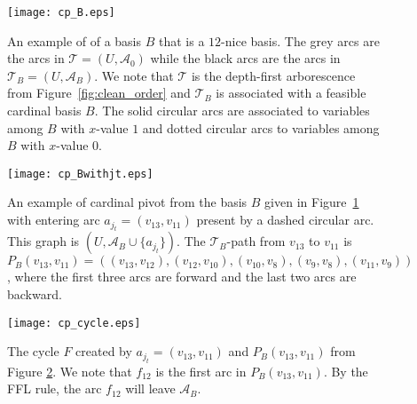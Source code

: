 \documentclass[11pt]{article}
\begin{document}
\begin{figure}[h!]
    \centering
    \texttt{[image: cp\_B.eps]}
    \caption{An example of of a basis $B$ that is a $12$-nice basis. The grey arcs are the arcs in  $\mathcal{T}=(U,\mathcal{A}_0)$ while the black arcs are the arcs in $\mathcal{T}_B=(U,\mathcal{A}_B)$. We note that $\mathcal{T}$ is the depth-first arborescence from Figure~\ref{fig:clean_order} and $\mathcal{T}_B$ is associated with a feasible cardinal basis $B$. The solid circular arcs are associated to variables among $B$ with $x$-value $1$ and dotted circular arcs to variables among $B$ with $x$-value $0$. }
    \label{fig:Pivoting-Ex-B}
\end{figure}

\begin{figure}[h!]
    \centering
    \texttt{[image: cp\_Bwithjt.eps]}
    \caption{An example of cardinal pivot from the basis $B$ given in Figure~\ref{fig:Pivoting-Ex-B} with entering arc $a_{j_t}=(v_{13},v_{11})$ present by a dashed circular arc. This graph is $(U,\mathcal{A}_B\cup\{a_{j_t}\})$. The $\mathcal{T}_B$-path from $v_{13}$ to $v_{11}$ is $P_B(v_{13},v_{11})=((v_{13},v_{12}),(v_{12},v_{10}),(v_{10},v_{8}),(v_{9},v_{8}),(v_{11},v_9))$, where the first three arcs are forward and the last two arcs are backward.}
    \label{fig:Pivoting-Ex-jt}
\end{figure}

\begin{figure}[h!]
    \centering
    \texttt{[image: cp\_cycle.eps]}
    \caption{The cycle $F$ created by $a_{j_t}=(v_{13},v_{11})$ and $P_B(v_{13},v_{11})$ from Figure \ref{fig:Pivoting-Ex-jt}. We note that $f_{12}$ is the first arc in $P_B(v_{13},v_{11})$. By the FFL rule, the arc $f_{12}$ will leave $\mathcal{A}_B$.}
    \label{fig:Pivoting-Ex-cycle}
\end{figure}
\end{document}
